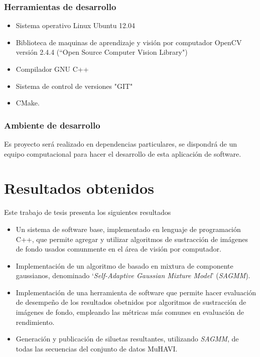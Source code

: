 \subsubsection{Herramientas de desarrollo}

\begin{itemize}
\item Sistema operativo Linux Ubuntu 12.04
\item Biblioteca de maquinas de aprendizaje y visión por computador OpenCV versión 2.4.4 (``Open Source Computer Vision Library")
\item Compilador GNU C++
\item Sistema de control de versiones "GIT"
\item CMake.
\end{itemize}

\subsubsection{Ambiente de desarrollo}

\indent Es proyecto será realizado en dependencias particulares, se dispondrá de un equipo computacional para hacer el desarrollo de esta aplicación de software.





\section{Resultados obtenidos}

Este trabajo de tesis presenta los siguientes resultados 
\begin{itemize}
\item Un sistema de software base, implementado en lenguaje de programación C++, que permite agregar y utilizar algoritmos de sustracción de imágenes de fondo usados comunmente en el área de visión por computador.
\item Implementación de un algoritmo de basado en mixtura de componente gaussianos, denominado `\textit{Self-Adaptive Gaussian Mixture Model}'  (\textit{SAGMM}).
\item Implementación de una herramienta de software que permite hacer evaluación de desempeño de los resultados obetnidos por algoritmos de sustracción de imágenes de fondo, empleando las métricas más comunes en evaluación de rendimiento.
\item Generación y publicación de siluetas resultantes, utilizando \textit{SAGMM}, de todas las secuencias del conjunto de datos MuHAVI.
\end{itemize}

